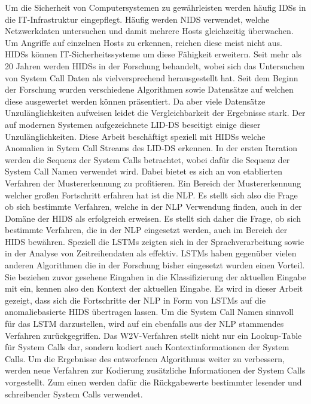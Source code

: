 Um die Sicherheit von Computersystemen zu gewährleisten werden häufig \acp{IDS} in die IT-Infrastruktur eingepflegt.
Häufig werden \ac{NIDS} verwendet, welche Netzwerkdaten untersuchen und damit mehrere Hosts gleichzeitig überwachen.
Um Angriffe auf einzelnen Hosts zu erkennen, reichen diese meist nicht aus.
\acp{HIDS} können IT-Sicherheitssysteme um diese Fähigkeit erweitern.
Seit mehr als 20 Jahren werden \acp{HIDS} in der Forschung behandelt, wobei sich das Untersuchen von System Call Daten als vielversprechend herausgestellt hat.
Seit dem Beginn der Forschung wurden verschiedene Algorithmen sowie Datensätze auf welchen diese ausgewertet werden können präsentiert.
Da aber viele Datensätze Unzulänglichkeiten aufweisen leidet die Vergleichbarkeit der Ergebnisse stark.
Der auf modernen Systemen aufgezeichnete \ac{LID-DS} beseitigt einige dieser Unzulänglichkeiten.
Diese Arbeit beschäftigt speziell mit \acp{HIDS} welche Anomalien in Sytem Call Streams des \ac{LID-DS} erkennen. 
In der  ersten Iteration werden die Sequenz der System Calls betrachtet, wobei dafür die Sequenz der System Call Namen verwendet wird.
Dabei bietet es sich an von etablierten Verfahren der Mustererkennung zu profitieren.
Ein Bereich der Mustererkennung welcher großen Fortschritt erfahren hat ist die \ac{NLP}.
Es stellt sich also die Frage ob sich bestimmte Verfahren, welche in der \ac{NLP} Verwendung finden, auch in der Domäne der \ac{HIDS} als erfolgreich erweisen.
Es stellt sich daher die Frage, ob sich bestimmte Verfahren, die in der \ac{NLP} eingesetzt werden, auch im Bereich der \ac{HIDS} bewähren.
Speziell die \acp{LSTM} zeigten sich in der Sprachverarbeitung sowie in der Analyse von Zeitreihendaten als effektiv.
\acp{LSTM} haben gegenüber vielen anderen Algorithmen die in der Forschung bisher eingesetzt wurden einen Vorteil.
Sie beziehen zuvor gesehene Eingaben in die Klassifizierung der aktuellen Eingabe mit ein, kennen also den Kontext der aktuellen Eingabe.
Es wird in dieser Arbeit gezeigt, dass sich die Fortschritte der \ac{NLP} in Form von \acp{LSTM} auf die anomaliebasierte \ac{HIDS} übertragen lassen.
Um die System Call Namen sinnvoll für das \ac{LSTM} darzustellen, wird auf ein ebenfalls aus der \ac{NLP} stammendes Verfahren zurückgegriffen.
Das \ac{W2V}-Verfahren stellt nicht nur ein Lookup-Table für System Calls dar, sondern kodiert auch Kontextinformationen der System Calls.
Um die Ergebnisse des entworfenen Algorithmus weiter zu verbessern, werden neue Verfahren zur Kodierung zusätzliche Informationen der System Calls vorgestellt.
Zum einen werden dafür die Rückgabewerte bestimmter lesender und schreibender System Calls verwendet. 
